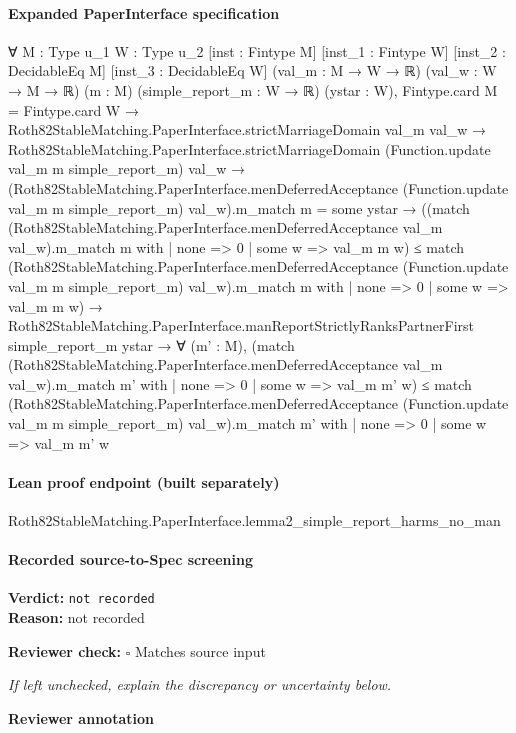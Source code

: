 \documentclass[10pt]{article}
\newcommand{\reviewerbox}{%
  \par\noindent\fbox{\parbox{0.96\linewidth}{\rule{0pt}{0.38in}}}\par
}
\newcommand{\reviewmatch}[1]{%
  \par\noindent\textbf{Reviewer check:} $\square$\; #1\par
  \noindent\emph{If left unchecked, explain the discrepancy or uncertainty below.}\par
}
\begin{document}
\paragraph{Expanded PaperInterface specification}
\begin{ReviewVerbatim}
∀ {M : Type u_1} {W : Type u_2} [inst : Fintype M] [inst_1 : Fintype W] [inst_2 : DecidableEq M]
  [inst_3 : DecidableEq W] (val_m : M → W → ℝ) (val_w : W → M → ℝ) (m : M) (simple_report_m : W → ℝ) (ystar : W),
  Fintype.card M = Fintype.card W →
    Roth82StableMatching.PaperInterface.strictMarriageDomain val_m val_w →
      Roth82StableMatching.PaperInterface.strictMarriageDomain (Function.update val_m m simple_report_m) val_w →
        (Roth82StableMatching.PaperInterface.menDeferredAcceptance (Function.update val_m m simple_report_m)
                  val_w).m_match
              m =
            some ystar →
          ((match (Roth82StableMatching.PaperInterface.menDeferredAcceptance val_m val_w).m_match m with
              | none => 0
              | some w => val_m m w) ≤
              match
                (Roth82StableMatching.PaperInterface.menDeferredAcceptance (Function.update val_m m simple_report_m)
                      val_w).m_match
                  m with
              | none => 0
              | some w => val_m m w) →
            Roth82StableMatching.PaperInterface.manReportStrictlyRanksPartnerFirst simple_report_m ystar →
              ∀ (m' : M),
                (match (Roth82StableMatching.PaperInterface.menDeferredAcceptance val_m val_w).m_match m' with
                  | none => 0
                  | some w => val_m m' w) ≤
                  match
                    (Roth82StableMatching.PaperInterface.menDeferredAcceptance (Function.update val_m m simple_report_m)
                          val_w).m_match
                      m' with
                  | none => 0
                  | some w => val_m m' w
\end{ReviewVerbatim}

\paragraph{Lean proof endpoint (built separately)}\begin{ReviewVerbatim}
Roth82StableMatching.PaperInterface.lemma2_simple_report_harms_no_man
\end{ReviewVerbatim}

\paragraph{Recorded source-to-Spec screening}
\textbf{Verdict:} \texttt{not recorded}
\\
\textbf{Reason:} not recorded
\reviewmatch{Matches source input}
\noindent\textbf{Reviewer annotation}\par
\reviewerbox
\clearpage
\hypertarget{source-claim-c7ba28726e90028a}{}
\end{document}
